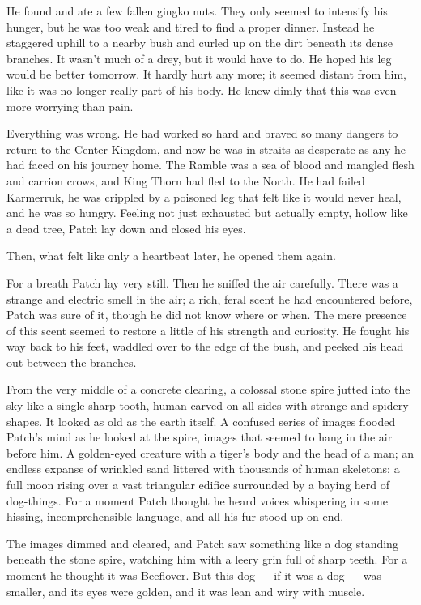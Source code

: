 \documentclass[ebook,oneside,openany,17pt]{memoir}
\begin{document}
He found and ate a few fallen gingko nuts. They only seemed to
intensify his hunger, but he was too weak and tired to find a proper
dinner. Instead he staggered uphill to a nearby bush and curled up on
the dirt beneath its dense branches. It wasn’t much of a drey, but it
would have to do. He hoped his leg would be better tomorrow. It hardly
hurt any more; it seemed distant from him, like it was no longer
really part of his body. He knew dimly that this was even more
worrying than pain.

Everything was wrong. He had worked so hard and braved so many dangers
to return to the Center Kingdom, and now he was in straits as
desperate as any he had faced on his journey home. The Ramble was a
sea of blood and mangled flesh and carrion crows, and King Thorn had
fled to the North. He had failed Karmerruk, he was crippled by a
poisoned leg that felt like it would never heal, and he was so
hungry. Feeling not just exhausted but actually empty, hollow like a
dead tree, Patch lay down and closed his eyes.

Then, what felt like only a heartbeat later, he opened them again.

For a breath Patch lay very still. Then he sniffed the air
carefully. There was a strange and electric smell in the air; a rich,
feral scent he had encountered before, Patch was sure of it, though he
did not know where or when. The mere presence of this scent seemed to
restore a little of his strength and curiosity. He fought his way back
to his feet, waddled over to the edge of the bush, and peeked his head
out between the branches.

From the very middle of a concrete clearing, a colossal stone spire
jutted into the sky like a single sharp tooth, human-carved on all
sides with strange and spidery shapes. It looked as old as the earth
itself. A confused series of images flooded Patch’s mind as he looked
at the spire, images that seemed to hang in the air before him. A
golden-eyed creature with a tiger’s body and the head of a man; an
endless expanse of wrinkled sand littered with thousands of human
skeletons; a full moon rising over a vast triangular edifice
surrounded by a baying herd of dog-things. For a moment Patch thought
he heard voices whispering in some hissing, incomprehensible language,
and all his fur stood up on end.

The images dimmed and cleared, and Patch saw something like a dog
standing beneath the stone spire, watching him with a leery grin full
of sharp teeth. For a moment he thought it was Beeflover. But this dog
— if it was a dog — was smaller, and its eyes were golden, and it was
lean and wiry with muscle.
\end{document}

